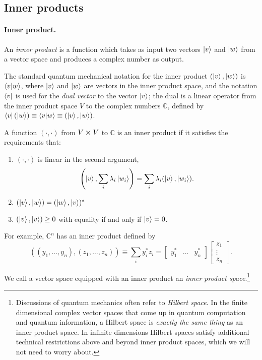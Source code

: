 \documentclass{article}
\begin{document}
\subsection{Inner products}

\paragraph{Inner product.} An \emph{inner product} is a function which takes as
input two vectors $\ket{v}$ and $\ket{w}$ from a vector space and produces a
complex number as output.

The standard quantum mechanical notation for the inner product $(\ket{v},
\ket{w})$ is $\braket{v}{w}$, where $\ket{v}$ and $\ket{w}$ are vectors in the
inner product space, and the notation $\bra{v}$ is used for the \emph{dual
vector} to the vector $\ket{v}$; the dual is a linear operator from the inner
product space $V$ to the complex numbers $\mathbb{C}$, defined by
$\bra{v}(\ket{w}) \equiv \braket{v}{w} \equiv (\ket{v}, \ket{w})$.

A function $(\cdot, \cdot)$ from $V \cross V$ to $\mathbb{C}$ is an inner
product if it satisfies the requirements that: \begin{enumerate}
  \item $(\cdot, \cdot)$ is linear in the second argument, \begin{equation}
      \left(\ket{v}, \sum_i \lambda_i\ket{w_i}\right) = \sum_i
      \lambda_i(\ket{v}, \ket{w_i}).
    \end{equation}
  \item $(\ket{v}, \ket{w}) = (\ket{w}, \ket{v})^*$
  \item $(\ket{v}, \ket{v}) \geq 0$ with equality if and only if $\ket{v} = 0$.
\end{enumerate}

For example, $\mathbb{C}^n$ has an inner product defined by \begin{equation}
  ((y_1, \ldots, y_n), (z_1, \ldots, z_n)) \equiv \sum_i y_i^*z_i =
    \begin{bmatrix}y_1^* & \dots & y_n^*\end{bmatrix}
    \begin{bmatrix}z_1 \\ \vdots \\ z_n\end{bmatrix}.
\end{equation}

We call a vector space equipped with an inner product an \emph{inner product
space}.\footnote{Discussions of quantum mechanics often refer to \emph{Hilbert
space}. In the finite dimensional complex vector spaces that come up in quantum
computation and quantum information, a Hilbert space is \emph{exactly the same
thing} as an inner product space. In infinite dimensions Hilbert spaces satisfy
additional technical restrictions above and beyond inner product spaces, which
we will not need to worry about.}
\end{document}
